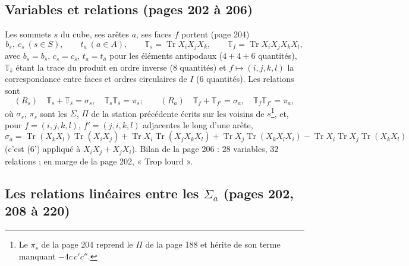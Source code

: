 \documentclass[11pt,a4paper]{article}
\begin{document}
\subsection*{Variables et relations (pages 202 à 206)}

Les sommets $s$ du cube, ses arêtes $a$, ses faces $f$ portent (page 204)
\[
  b_s,\ c_s\ (s \in S),\qquad t_a\ (a \in A),\qquad \mathbb{T}_s =
  \operatorname{Tr}X_iX_jX_k,\qquad \mathbb{T}_f = \operatorname{Tr}X_iX_jX_kX_l,
\]
avec $b_s = b_{\bar s}$, $c_s = c_{\bar s}$, $t_a = t_{\bar a}$ pour les
éléments antipodaux ($4 + 4 + 6$ quantités), $\mathbb{T}_{\bar s}$ étant la
trace du produit en ordre inverse ($8$ quantités) et $f \mapsto (i, j, k, l)$
la correspondance entre faces et ordres circulaires de $I$ ($6$ quantités). Les
relations sont
\[
  (R_s)\quad \mathbb{T}_s + \mathbb{T}_{\bar s} = \sigma_s,\quad
  \mathbb{T}_s\mathbb{T}_{\bar s} = \pi_s ;\qquad
  (R_a)\quad \mathbb{T}_f + \mathbb{T}_{f'} = \sigma_a,\quad
  \mathbb{T}_f\mathbb{T}_{f'} = \pi_a ,
\]
où $\sigma_s$, $\pi_s$ sont les $\Sigma$, $\Pi$ de la station précédente
écrits sur les voisins de $s$\footnote{Le $\pi_s$ de la page 204 reprend le
$\Pi$ de la page 188 et hérite de son terme manquant $-4c\,c'c''$.}, et, pour
$f = (i, j, k, l)$, $f' = (j, i, k, l)$ adjacentes le long d'une arête,
\[
  \sigma_a = \operatorname{Tr}(X_kX_l)\operatorname{Tr}(X_iX_j) + \operatorname{Tr}X_i
  \operatorname{Tr}(X_jX_kX_l) + \operatorname{Tr}X_j\operatorname{Tr}(X_kX_lX_i) -
  \operatorname{Tr}X_i\operatorname{Tr}X_j\operatorname{Tr}(X_kX_l)
\]
(c'est (6') appliqué à $X_iX_j + X_jX_i$). Bilan de la page 206 : $28$
variables, $32$ relations ; en marge de la page 202, « Trop lourd ».

\subsection*{Les relations linéaires entre les $\Sigma_a$ (pages 202, 208 à 220)}
\end{document}
